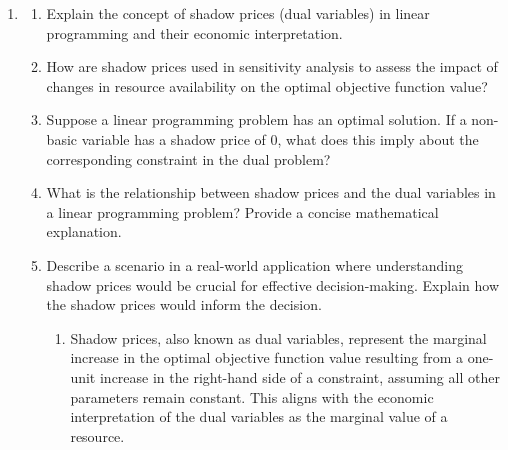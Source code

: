 \documentclass{article}%
\newcommand{\incorrect}[1]{\textcolor{red}{#1}}
\begin{document}
\begin{enumerate}
\begin{enumerate}
\item Shadow prices are numerically equivalent to the optimal values of the dual variables.  They both represent the marginal value of increasing a resource (relaxing a constraint).%
\item \incorrect{There is a direct and crucial relationship: shadow prices are the optimal dual variables.}%
\item \incorrect{Shadow prices are not the reciprocals of the dual variables.  There's a direct numerical equivalence.}%
\end{enumerate}%
\vspace{1em}%
\item%
\begin{enumerate}%
\item Explain the concept of shadow prices (dual variables) in linear programming and their economic interpretation.%
\begin{enumerate}%
\end{enumerate}%
\vspace{0.5em}%
\item How are shadow prices used in sensitivity analysis to assess the impact of changes in resource availability on the optimal objective function value?%
\begin{enumerate}%
\end{enumerate}%
\vspace{0.5em}%
\item Suppose a linear programming problem has an optimal solution. If a non-basic variable has a shadow price of 0, what does this imply about the corresponding constraint in the dual problem?%
\begin{enumerate}%
\end{enumerate}%
\vspace{0.5em}%
\item What is the relationship between shadow prices and the dual variables in a linear programming problem? Provide a concise mathematical explanation.%
\begin{enumerate}%
\end{enumerate}%
\vspace{0.5em}%
\item Describe a scenario in a real-world application where understanding shadow prices would be crucial for effective decision-making. Explain how the shadow prices would inform the decision.%
\begin{enumerate}%
\item Shadow prices, also known as dual variables, represent the marginal increase in the optimal objective function value resulting from a one-unit increase in the right-hand side of a constraint, assuming all other parameters remain constant.  This aligns with the economic interpretation of the dual variables as the marginal value of a resource.%

\end{enumerate}
\end{enumerate}
\end{enumerate}
\end{document}
